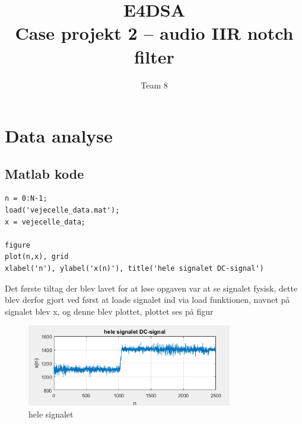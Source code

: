 \documentclass{article}
\title{E4DSA\\ Case projekt 2 – audio IIR notch filter}
\author{Team 8}
\begin{document}
\maketitle
\tableofcontents
\newpage

\section{Data analyse}
\label{sec:Data analyse}

\subsection{Matlab kode}
\label{sec:matlab1}

\begin{lstlisting}
n = 0:N-1;
load('vejecelle_data.mat');
x = vejecelle_data;

figure
plot(n,x), grid
xlabel('n'), ylabel('x(n)'), title('hele signalet DC-signal')
\end{lstlisting}

Det første tiltag der blev lavet for at løse opgaven var at se signalet fysisk, dette blev derfor gjort ved først at loade signalet ind via load funktionen, navnet på signalet blev x, og denne blev plottet, plottet ses på figur 
\begin{figure}[h!]
  \centering
  \includegraphics[width=0.8\textwidth]{rod/startsignal.png}
  \caption{hele signalet}
  \label{fig:helesignal}
\end{figure}
\end{document}
